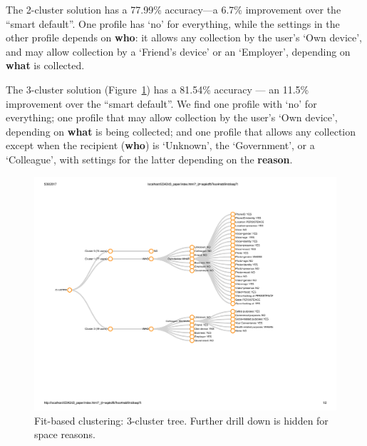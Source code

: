 The 2-cluster solution has a 77.99\% accuracy---a 6.7\% improvement over the ``smart default''. One profile has `no' for everything, while the settings in the other profile depends on \textbf{who}: it allows any collection by the user's `Own device', and may allow collection by a `Friend's device' or an `Employer', depending on \textbf{what} is collected.



The 3-cluster solution (Figure~\ref{fig:3clustersFit}) has a 81.54\% accuracy --- an 11.5\% improvement over the ``smart default''. We find one profile with `no' for everything; one profile that may allow collection by the user's `Own device', depending on \textbf{what} is being collected; and one profile that allows any collection except when the recipient (\textbf{who}) is `Unknown', the `Government', or a `Colleague', with settings for the latter depending on the \textbf{reason}.

\begin{figure}
	\centering
	\includegraphics[angle=90,origin=c]{figures/fit-based-3c.pdf}
	\caption{Fit-based clustering: 3-cluster tree. Further drill down is hidden for space reasons.}
	\label{fig:3clustersFit}
\end{figure}

